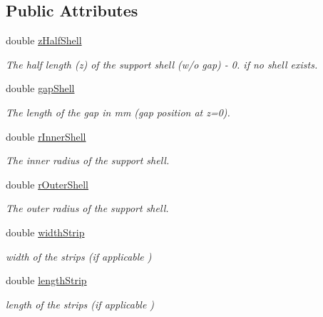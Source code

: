 \subsection*{Public Attributes}
\begin{DoxyCompactItemize}
\item 
double \hyperlink{struct_d_d4hep_1_1_d_d_rec_1_1_z_planar_struct_acd368faf55766bd4b57296660458185c}{z\+Half\+Shell}
\begin{DoxyCompactList}\small\item\em The half length (z) of the support shell (w/o gap) -\/ 0. if no shell exists. \end{DoxyCompactList}\item 
double \hyperlink{struct_d_d4hep_1_1_d_d_rec_1_1_z_planar_struct_a5136dbae308df17406ebd522459899ca}{gap\+Shell}
\begin{DoxyCompactList}\small\item\em The length of the gap in mm (gap position at z=0). \end{DoxyCompactList}\item 
double \hyperlink{struct_d_d4hep_1_1_d_d_rec_1_1_z_planar_struct_a34989dd51686b6107bf9d322eabf76b0}{r\+Inner\+Shell}
\begin{DoxyCompactList}\small\item\em The inner radius of the support shell. \end{DoxyCompactList}\item 
double \hyperlink{struct_d_d4hep_1_1_d_d_rec_1_1_z_planar_struct_a298b12433c81ef9750730620293f7cfa}{r\+Outer\+Shell}
\begin{DoxyCompactList}\small\item\em The outer radius of the support shell. \end{DoxyCompactList}\item 
double \hyperlink{struct_d_d4hep_1_1_d_d_rec_1_1_z_planar_struct_af557ea4c315a65436763c0b2b91750ff}{width\+Strip}
\begin{DoxyCompactList}\small\item\em width of the strips (if applicable ) \end{DoxyCompactList}\item 
double \hyperlink{struct_d_d4hep_1_1_d_d_rec_1_1_z_planar_struct_ae17170e893c4b0a60f3757bffac7b3c9}{length\+Strip}
\begin{DoxyCompactList}\small\item\em length of the strips (if applicable ) \end{DoxyCompactList}\item 

\end{DoxyCompactItemize}

